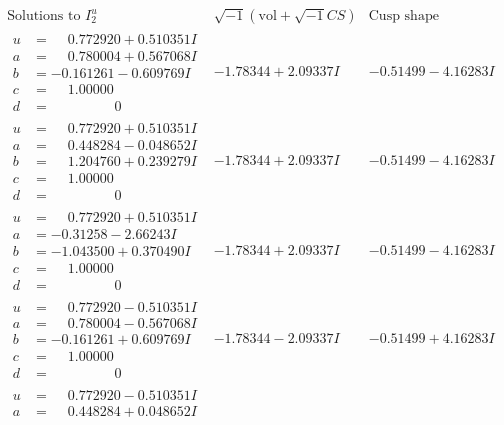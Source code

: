 \documentclass[1p]{elsarticle_modified}
\theoremstyle{definition}
\newcommand{\I}{\sqrt{-1}}
\begin{document}
$$\begin{array}{c|c|c}  
\text{Solutions to }I^u_{2}& \I (\text{vol} + \sqrt{-1}CS) & \text{Cusp shape}\\
 \hline 
\begin{aligned}
u &= \phantom{-}0.772920 + 0.510351 I \\
a &= \phantom{-}0.780004 + 0.567068 I \\
b &= -0.161261 - 0.609769 I \\
c &= \phantom{-}1.00000\phantom{ +0.000000I} \\
d &= \phantom{-0.000000 } 0\end{aligned}
 & -1.78344 + 2.09337 I & -0.51499 - 4.16283 I \\ \hline\begin{aligned}
u &= \phantom{-}0.772920 + 0.510351 I \\
a &= \phantom{-}0.448284 - 0.048652 I \\
b &= \phantom{-}1.204760 + 0.239279 I \\
c &= \phantom{-}1.00000\phantom{ +0.000000I} \\
d &= \phantom{-0.000000 } 0\end{aligned}
 & -1.78344 + 2.09337 I & -0.51499 - 4.16283 I \\ \hline\begin{aligned}
u &= \phantom{-}0.772920 + 0.510351 I \\
a &= -0.31258 - 2.66243 I \\
b &= -1.043500 + 0.370490 I \\
c &= \phantom{-}1.00000\phantom{ +0.000000I} \\
d &= \phantom{-0.000000 } 0\end{aligned}
 & -1.78344 + 2.09337 I & -0.51499 - 4.16283 I \\ \hline\begin{aligned}
u &= \phantom{-}0.772920 - 0.510351 I \\
a &= \phantom{-}0.780004 - 0.567068 I \\
b &= -0.161261 + 0.609769 I \\
c &= \phantom{-}1.00000\phantom{ +0.000000I} \\
d &= \phantom{-0.000000 } 0\end{aligned}
 & -1.78344 - 2.09337 I & -0.51499 + 4.16283 I \\ \hline\begin{aligned}
u &= \phantom{-}0.772920 - 0.510351 I \\
a &= \phantom{-}0.448284 + 0.048652 I \\

\end{aligned}
\end{array}$$
\end{document}
